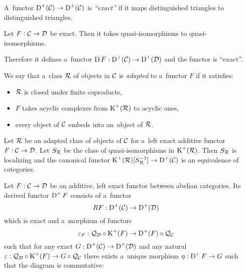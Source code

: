 



	\begin{definition}[``exactness'']
		A~functor $\operatorname{D}^+(\mathcal{C}) \to \operatorname{D}^+(\mathcal{C})$ is \emph{``exact''} if 
		it maps distinguished triangles to distinguished triangles.
	\end{definition}
	
	\begin{proposition}
		Let $F:\mathcal{C} \to \mathcal{D}$ be exact. Then it takes quasi-isomorphisms to quasi-isomorphisms.
		
		Therefore it defines a~functor $\operatorname{D} F:\operatorname{D}^+(\mathcal{C}) \to \operatorname{D}^+(\mathcal{D})$
		and the functor is ``exact''.
	\end{proposition}
	
	\begin{definition}
		We say that a~class ${\mathcal{R}}$ of objects in $\mathcal{C}$ is \emph{adapted}
		to a~functor $F$ if it satisfies:
		\begin{itemize}
			\item ${\mathcal{R}}$ is closed under finite coproducts,
			\item $F$ takes acyclic complexes from $\operatorname{K}^+({\mathcal{R}})$ 
			to acyclic ones,
			\item every object of $\mathcal{C}$ embeds into an~object of ${\mathcal{R}}$.
		\end{itemize}

	\end{definition}
	
	\begin{proposition}
		Let ${\mathcal{R}}$ be an adapted class of objects of $\mathcal{C}$
		for a~left exact additive functor $F:\mathcal{C} \to \mathcal{D}$.
		Let $S_{\mathcal{R}}$ be the class of quasi-isomorphisms in $\operatorname{K}^+({\mathcal{R}})$.
		Then $S_{\mathcal{R}}$ is localizing and the canonical functor
		$\operatorname{K}^+({\mathcal{R}})[S^{-1}_{\mathcal{R}}] \to \operatorname{D}^+(\mathcal{C})$
		is an equivalence of categories.
	\end{proposition}
	
	\begin{definition}
		Let $F: \mathcal{C} \to \mathcal{D}$ be an additive, left exact functor between 
		abelian categories.
		Its derived functor $\operatorname{D}^+F$ consists of a~functor 
		$$RF:\operatorname{D}^+(\mathcal{C}) \to \operatorname{D}^+(\mathcal{D})$$ which is exact and a~morphism of functors
		$$\varepsilon_F: \mathcal{Q}_{\mathcal{D}} \circ \operatorname{K}^+(F) \to \operatorname{D}^+(F) \circ \mathcal{Q}_{\mathcal{C}}$$
		such that 
		for any exact $G:\operatorname{D}^+(\mathcal{C}) \to \operatorname{D}^+(\mathcal{D})$ and any natural
		${\varepsilon: \mathcal{Q}_{\mathcal{D}} \circ \operatorname{K}^+(F) \to G \circ \mathcal{Q}_{\mathcal{C}}}$ 
		there exists a~unique morphism $\eta: \operatorname{D}^+ F \to G$ such that
		the diagram is commutative:
	\end{definition}
	
